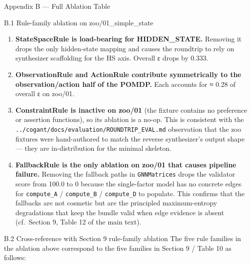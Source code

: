 \documentclass[
  ignorenonframetext,
]{beamer}
\begin{document}
\begin{frame}[fragile]{Appendix B --- Full Ablation Table}
\begin{block}{B.1 Rule-family ablation on zoo/01\_simple\_state}
\begin{enumerate}
\item
  \textbf{StateSpaceRule is load-bearing for HIDDEN\_STATE.} Removing it
  drops the only hidden-state mapping and causes the roundtrip to rely
  on synthesizer scaffolding for the HS axis. Overall ε drops by 0.333.
\item
  \textbf{ObservationRule and ActionRule contribute symmetrically to the
  observation/action half of the POMDP.} Each accounts for ≈ 0.28 of
  overall ε on zoo/01.
\item
  \textbf{ConstraintRule is inactive on zoo/01} (the fixture contains no
  preference or assertion functions), so its ablation is a no-op. This
  is consistent with the
  \texttt{../cogant/docs/evaluation/ROUNDTRIP\_EVAL.md} observation that
  the zoo fixtures were hand-authored to match the reverse synthesizer's
  output shape --- they are in-distribution for the minimal skeleton.
\item
  \textbf{FallbackRule is the only ablation on zoo/01 that causes
  pipeline failure.} Removing the fallback paths in \texttt{GNNMatrices}
  drops the validator score from 100.0 to 0 because the single-factor
  model has no concrete edges for \texttt{compute\_A} /
  \texttt{compute\_B} / \texttt{compute\_D} to populate. This confirms
  that the fallbacks are not cosmetic but are the principled
  maximum-entropy degradations that keep the bundle valid when edge
  evidence is absent (cf.~Section 9, Table 12 of the main text).
\end{enumerate}
\end{block}

\begin{block}{B.2 Cross-reference with Section 9 rule-family ablation}
\protect{}\label{b.2-cross-reference-with-section-9-rule-family-ablation}
The five rule families in the ablation above correspond to the five
families in Section 9 / Table 10 as follows:


\end{block}
\end{frame}
\end{document}
